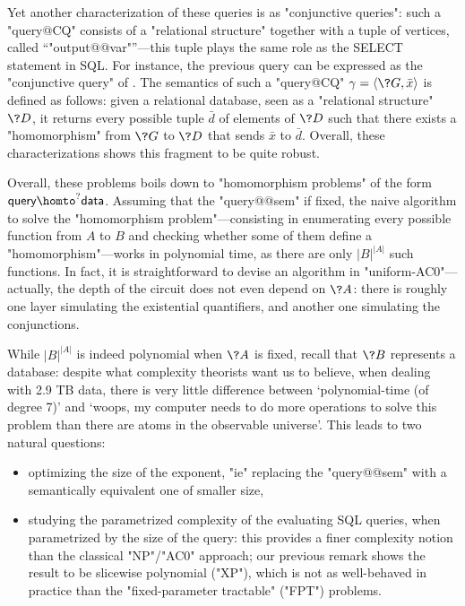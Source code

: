 Yet another characterization of these queries is as "conjunctive queries": such a "query@CQ"
consists of a "relational structure" together with a tuple of vertices, called ``"output@@var"''---this tuple
plays the same role as the \textsf{SELECT} statement in SQL.
For instance, the previous query can be expressed as the "conjunctive query"
of . The semantics of such a "query@CQ"
$\gamma = \tup{\?G, \bar x}$ is defined as follows:
given a relational database, seen as a "relational structure" $\?D$,
it returns every possible tuple $\bar d$ of elements of $\?D$ such that
there exists a "homomorphism" from $\?G$ to $\?D$ that sends $\bar x$ to $\bar d$.
Overall, these characterizations shows this fragment to be quite robust.

Overall, these problems boils down to
"homomorphism problems" of the form $\textsf{query} \homto^? \textsf{data}$.
Assuming that the "query@@sem" if fixed,
the naive algorithm to solve the "homomorphism problem"---consisting in enumerating
every possible function from $A$ to $B$ and checking whether some of them
define a "homomorphism"---works in polynomial time, as there are only $|B|^{|A|}$ such functions.
In fact, it is straightforward to devise an algorithm in "uniform-AC0"---actually, the depth
of the circuit does not even depend on $\?A$: there is roughly one layer simulating the
existential quantifiers, and another one simulating the conjunctions.

While $|B|^{|A|}$ is indeed polynomial when $\?A$ is fixed,
recall that $\?B$ represents a database: despite what complexity theorists want us to believe,
when dealing with 2.9 TB data, there is very little difference between
`polynomial-time (of degree 7)' and `woops, my computer needs to do more operations to solve
this problem than there are atoms in the observable universe'.
This leads to two natural questions:
\begin{itemize}
	\item optimizing the size of the exponent, "ie"
		replacing the "query@@sem" with a semantically equivalent one of smaller size,
	\item studying the parametrized complexity of the evaluating SQL queries, when parametrized by
		the size of the query: this provides a finer complexity notion than
		the classical "NP"/"AC0" approach; our previous remark shows the result to be
		slicewise polynomial ("XP"), which is not as well-behaved in practice than
		the "fixed-parameter tractable" ("FPT") problems.
\end{itemize}

